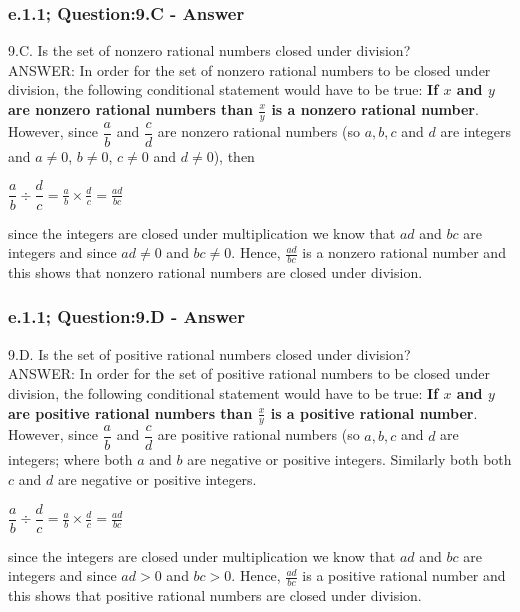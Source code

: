\subsubsection*{e.1.1; Question:9.C - Answer}
9.C. Is the set of nonzero rational numbers closed under division? \\

ANSWER: In order for the set of nonzero rational numbers to be closed under division, the following conditional statement would have to be true: {\bf If $x$ and $y$ are nonzero rational numbers than $\frac{x}{y}$ is a nonzero rational number}. However, since $\dfrac{a}{b}$ and $\dfrac{c}{d}$ are nonzero rational numbers (so $a,b,c$ and $d$ are integers and  $a \neq 0$, $b \neq 0$, $c \neq 0$ and $d \neq 0$), then \\

\begin{center}
$\dfrac{a}{b} \div \dfrac{d}{c} = \frac{a}{b} \times \frac{d}{c} = \frac{ad}{bc}$
\end{center}

since the integers are closed under multiplication we know that $ad$ and $bc$ are integers and since $ad \neq 0$ and $bc \neq 0$. Hence, $\frac{ad}{bc}$ is a nonzero rational number and this shows that nonzero rational numbers are closed under division. \\

\subsubsection*{e.1.1; Question:9.D - Answer}
9.D. Is the set of positive rational numbers closed under division? \\

ANSWER: In order for the set of positive rational numbers to be closed under division, the following conditional statement would have to be true: {\bf If $x$ and $y$ are positive rational numbers than $\frac{x}{y}$ is a positive rational number}. However, since $\dfrac{a}{b}$ and $\dfrac{c}{d}$ are positive rational numbers (so $a,b,c$ and $d$ are integers; where both $a$ and $b$ are negative or positive integers. Similarly both both $c$ and $d$ are negative or positive integers. \\

\begin{center}
$\dfrac{a}{b} \div \dfrac{d}{c} = \frac{a}{b} \times \frac{d}{c} = \frac{ad}{bc}$
\end{center}

since the integers are closed under multiplication we know that $ad$ and $bc$ are integers and since $ad > 0$ and $bc > 0$. Hence, $\frac{ad}{bc}$ is a positive rational number and this shows that positive rational numbers are closed under division. \\


